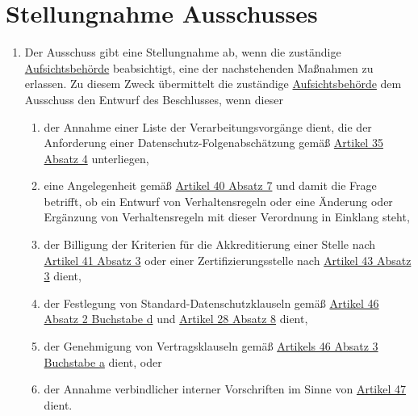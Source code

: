 \chapter{Stellungnahme Ausschusses}
\label{ch:64}


\begin{enumerate}

  \item Der Ausschuss gibt eine Stellungnahme ab, wenn die zuständige \hyperref[itm:04-21]{Aufsichtsbehörde} beabsichtigt, eine der
   nachstehenden Maßnahmen zu erlassen. Zu diesem Zweck übermittelt die zuständige \hyperref[itm:04-21]{Aufsichtsbehörde} dem Ausschuss den
   Entwurf des Beschlusses, wenn dieser
  \label{itm:64-1}

  \begin{enumerate}
  
    \item der Annahme einer Liste der Verarbeitungsvorgänge dient, die der Anforderung einer
     Datenschutz-Folgenabschätzung gemäß \hyperref[itm:35-4]{Artikel 35 Absatz 4} unterliegen,
    \label{itm:64-1a}

    \item eine Angelegenheit gemäß \hyperref[itm:40-7]{Artikel 40 Absatz 7} und damit die Frage betrifft, ob ein Entwurf
     von Verhaltensregeln oder eine Änderung oder Ergänzung von Verhaltensregeln mit dieser Verordnung in Einklang
     steht,
    \label{itm:64-1b}

    \item der Billigung der Kriterien für die Akkreditierung einer Stelle nach \hyperref[itm:41-3]{Artikel 41 Absatz 3}
     oder einer Zertifizierungsstelle nach \hyperref[itm:43-3]{Artikel 43 Absatz 3} dient,
    \label{itm:64-1c}

    \item der Festlegung von Standard-Datenschutzklauseln gemäß \hyperref[itm:46-2d]{Artikel 46 Absatz 2 Buchstabe d}
     und \hyperref[itm:28-8]{Artikel 28 Absatz 8} dient,
    \label{itm:64-1d}

    \item der Genehmigung von Vertragsklauseln gemäß \hyperref[itm:46-3a]{Artikels 46 Absatz 3 Buchstabe a} dient, oder
    \label{itm:64-1e}

    \item der Annahme verbindlicher interner Vorschriften im Sinne von \hyperref[ch:47]{Artikel 47} dient.
    \label{itm:64-1f}


\end{enumerate}
\end{enumerate}
